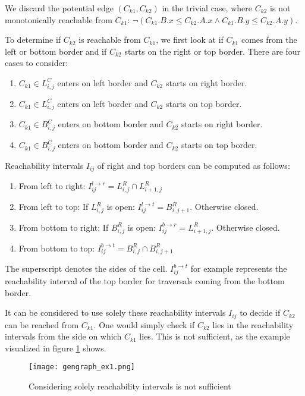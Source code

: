 We discard the potential edge $(C_{k1}, C_{k2})$ in the trivial case, where $C_{k2}$ is not monotonically reachable from $C_{k1}$: $\neg(C_{k1}.B.x \leq C_{k2}.A.x \wedge C_{k1}.B.y \leq C_{k2}.A.y)$.

To determine if $C_{k2}$ is reachable from $C_{k1}$, we first look at if $C_{k1}$ comes from the left or bottom border and if $C_{k2}$ starts on the right or top border. There are four cases to consider:

\begin{enumerate}
	\item $C_{k1} \in L_{i, j}^C$ enters on left border and $C_{k2}$ starts on right border.
	\item $C_{k1} \in L_{i, j}^C$ enters on left border and $C_{k2}$ starts on top border.
	\item $C_{k1} \in B_{i, j}^C$ enters on bottom border and $C_{k2}$ starts on right border.
	\item $C_{k1} \in B_{i, j}^C$ enters on bottom border and $C_{k2}$ starts on top border.
\end{enumerate}

Reachability intervals $I_{ij}$ of right and top borders can be computed as follows:

\begin{enumerate}
	\item From left to right: $I_{ij}^{l \rightarrow r} = L_{i, j}^R \cap L_{i+1, j}^R$
	\item From left to top: If $L_{i, j}^R$ is open: $I_{ij}^{l \rightarrow t} = B_{i, j+1}^R$. Otherwise closed.
	\item From bottom to right: If $B_{i, j}^R$ is open: $I_{ij}^{b \rightarrow r} = L_{i+1, j}^R$. Otherwise closed.
	\item From bottom to top: $I_{ij}^{b \rightarrow t} = B_{i, j}^R \cap B_{i, j+1}^R$
\end{enumerate}

The superscript denotes the sides of the cell. $I_{ij}^{b \rightarrow t}$ for example represents the reachability interval of the top border for traversals coming from the bottom border.

It can be considered to use solely these reachability intervals $I_{ij}$ to decide if $C_{k2}$ can be reached from $C_{k1}$. One would simply check if $C_{k2}$ lies in the reachability intervals from the side on which $C_{k1}$ lies. This is not sufficient, as the example visualized in figure \ref{fig:gengraph_ex1} shows.

\begin{figure}[H]
    \centering
    
    \texttt{[image: gengraph\_ex1.png]}
		
	\caption{Considering solely reachability intervals is not sufficient\protect\footnotemark}
    \label{fig:gengraph_ex1}
\end{figure}

